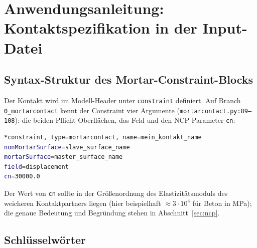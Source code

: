 \documentclass[a4paper,11pt]{article}
\newcommand{\code}[1]{\texttt{\small #1}}
\newcommand{\file}[1]{\texttt{\small #1}}
\let\stdsection\section
\renewcommand{\section}{\clearpage\stdsection}
\begin{document}
\appendix
\section{Anwendungsanleitung: Kontaktspezifikation in der Input-Datei}
\label{sec:inputfile}

\subsection{Syntax-Struktur des Mortar-Constraint-Blocks}

Der Kontakt wird im Modell-Header unter \code{*constraint} definiert. Auf Branch
\code{0\_mortarcontact} kennt der Constraint vier Argumente (\file{mortarcontact.py:\allowbreak{}89--108}): die
beiden Pflicht-Oberflächen, das Feld und den NCP-Parameter \code{cn}:

\begin{lstlisting}[language=bash,caption={Mortar-Kontakt-Block (reibungsfrei) in der EdelweissFE Input-Datei}]
*constraint, type=mortarcontact, name=mein_kontakt_name
nonMortarSurface=slave_surface_name
mortarSurface=master_surface_name
field=displacement
cn=30000.0
\end{lstlisting}

Der Wert von \code{cn} sollte in der Größenordnung des Elastizitätsmoduls des weicheren
Kontaktpartners liegen (hier beispielhaft $\approx3\cdot10^4$ für Beton in MPa); die genaue
Bedeutung und Begründung stehen in Abschnitt~\ref{sec:ncp}.

\subsection{Schlüsselwörter}
\end{document}
